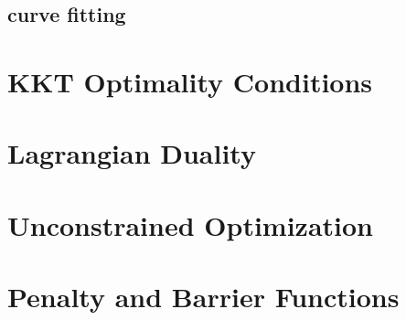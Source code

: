 		\section{curve fitting}
			

	\chapter{KKT Optimality Conditions}

	\chapter{Lagrangian Duality}

	\chapter{Unconstrained Optimization}

	\chapter{Penalty and Barrier Functions}